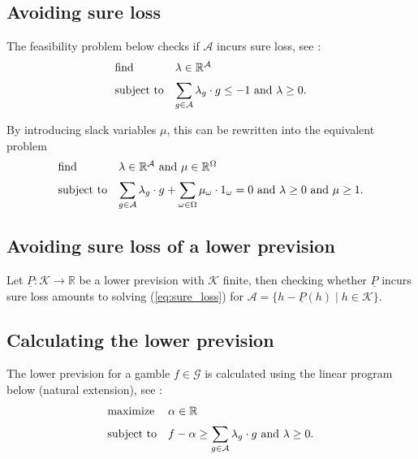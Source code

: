 \documentclass{article}
\theoremstyle{mytheorem}
\newcommand{\set}[1]{\ensuremath{\{ #1 \} }} %
\begin{document}
\subsection{Avoiding sure loss}
The feasibility problem below checks if $\mathcal{A}$ incurs sure loss, see \cite{Quaeghebeur2012}:
\begin{equation} \label{eq:sure_loss}
\begin{array}{ll}
    \text{find} & \lambda \in \mathbb{R}^\mathcal{A} \\ [\medskipamount]
    \text{subject to} & 
    \displaystyle \sum_{g \in \mathcal{A}} \lambda_g \cdot g \leq -1 \text{ and } \lambda \geq 0.
\end{array}
\end{equation}

\vspace{0.5cm}
\noindent
By introducing slack variables $\mu$, this can be rewritten into the equivalent problem
\begin{equation} \label{eq:sure_loss_slack}
\begin{array}{ll}
    \text{find} & \lambda \in \mathbb{R}^\mathcal{A} \text{ and } \mu \in \mathbb{R}^\Omega \\ [\medskipamount]
    \text{subject to} & 
    \displaystyle \sum_{g \in \mathcal{A}} \lambda_g \cdot g +
    \sum\limits_{\omega \in \Omega} \mu_\omega \cdot 1_\omega = 0
    \text{ and } \lambda \geq 0 \text{ and } \mu \geq 1.
\end{array}
\end{equation}

\subsection{Avoiding sure loss of a lower prevision}
Let $\underline{P}: \mathcal{K} \rightarrow \mathbb{R}$ be a lower prevision with $\mathcal{K}$ finite, then checking whether $\underline{P}$ incurs sure loss amounts to solving (\ref{eq:sure_loss}) for $\mathcal{A} = \set{h - \underline{P}(h) \mid h \in \mathcal{K}}$.

\subsection{Calculating the lower prevision}
The lower prevision for a gamble $f \in \mathcal{G}$ is calculated using the linear program below (natural extension), see \cite{Quaeghebeur2012}:
\begin{equation} \label{eq:lower_prevision_avoid_sure_loss}
\begin{array}{ll}
    \text{maximize} & \alpha \in \mathbb{R} \\ [\medskipamount]
    \text{subject to} & f - \alpha \geq 
    \displaystyle \sum_{g \in \mathcal{A}} \lambda_g \cdot g \text{ and } \lambda \geq 0.
\end{array}
\end{equation}
\end{document}
